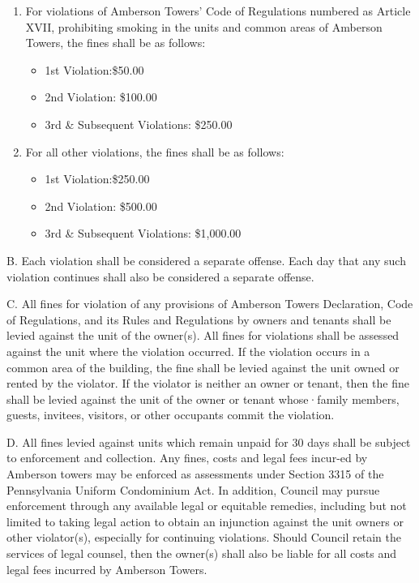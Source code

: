 \documentclass[
]{book}
\providecommand{\tightlist}{%
  \setlength{\itemsep}{0pt}\setlength{\parskip}{0pt}}
\begin{document}
\begin{enumerate}
\def\labelenumi{\arabic{enumi}.}
\tightlist
\item
  For violations of Amberson Towers' Code of Regulations numbered as Article XVII, prohibiting smoking in the units and common areas of Amberson Towers, the fines shall be as follows:

  \begin{itemize}
  \tightlist
  \item
    1st Violation:\$50.00
  \item
    2nd Violation: \$100.00
  \item
    3rd \& Subsequent Violations: \$250.00
  \end{itemize}
\item
  For all other violations, the fines shall be as follows:

  \begin{itemize}
  \tightlist
  \item
    1st Violation:\$250.00
  \item
    2nd Violation: \$500.00
  \item
    3rd \& Subsequent Violations: \$1,000.00
  \end{itemize}
\end{enumerate}

B. Each violation shall be considered a separate offense. Each day that any such violation continues shall also be considered a separate offense.

C. All fines for violation of any provisions of Amberson Towers Declaration, Code of Regulations, and its Rules and Regulations by owners and tenants shall be levied against the unit of the owner(s). All fines for violations shall be assessed against the unit where the violation occurred. If the violation occurs in a common area of the building, the fine shall be levied against the unit owned or rented by the violator. If the violator is neither an owner or tenant, then the fine shall be levied against the unit of the owner or tenant whose·family members, guests, invitees, visitors, or other occupants commit the violation.

D. All fines levied against units which remain unpaid for 30 days shall be subject to enforcement and collection. Any fines, costs and legal fees incur-ed by Amberson towers may be enforced as assessments under Section 3315 of the Pennsylvania Uniform Condominium Act. In addition, Council may pursue enforcement through any available legal or equitable remedies, including but not limited to taking legal action to obtain an injunction against the unit owners or other violator(s), especially for continuing violations. Should Council retain the services of legal counsel, then the owner(s) shall also be liable for all costs and legal fees incurred by Amberson Towers.
\end{document}
